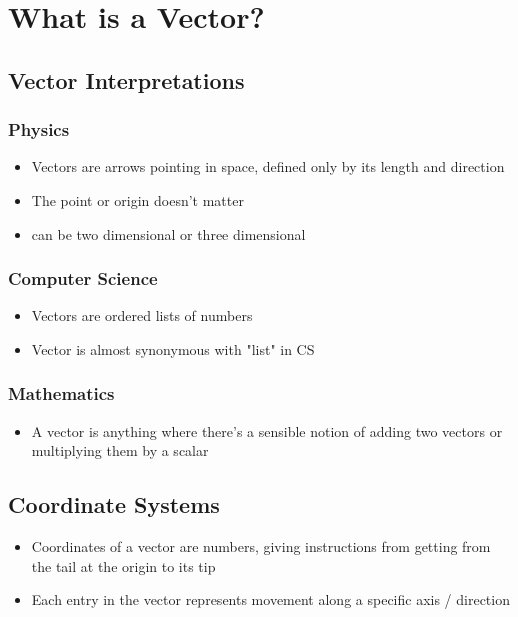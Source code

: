 \section{What is a Vector?}\label{sec:vectors}

\subsection{Vector Interpretations}

\subsubsection{Physics}
\begin{itemize}
    \item Vectors are arrows pointing in space, defined only by its length and direction 
    \item The point or origin doesn't matter
    \item can be two dimensional or three dimensional
\end{itemize}

\subsubsection{Computer Science}
\begin{itemize}
    \item Vectors are ordered lists of numbers
    \item Vector is almost synonymous with "list" in CS
\end{itemize}

\subsubsection{Mathematics}
\begin{itemize}
    \item A vector is anything where there's a sensible notion of adding two vectors or multiplying them by a scalar
\end{itemize}

\subsection{Coordinate Systems}
\begin{itemize}
    \item Coordinates of a vector are numbers, giving instructions from getting from the tail at the origin to its tip
    \item Each entry in the vector represents movement along a specific axis / direction
\end{itemize}

